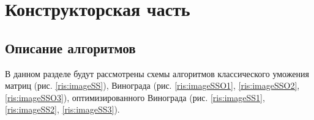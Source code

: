 \chapter{Конструкторская часть}

\section{Описание алгоритмов}
В данном разделе будут рассмотрены схемы алгоритмов классического уможения матриц (рис. \ref{ris:imageSS}), Винограда (рис. \ref{ris:imageSSO1}, \ref{ris:imageSSO2}, \ref{ris:imageSSO3}), оптимизированного Винограда (рис. \ref{ris:imageSS1}, \ref{ris:imageSS2}, \ref{ris:imageSS3}).
\begin{center}
	

\newpage
	\centering
	\def\svgwidth{7cm}
	
	\label{ris:imageSS}
\newpage
\centering
\def\svgwidth{3.5cm}

\label{ris:imageSSO1}
\newpage
\centering
\def\svgwidth{7cm}

\label{ris:imageSSO2}
\newpage
\centering
\def\svgwidth{12cm}

\label{ris:imageSSO3}
\newpage
	\centering
	\def\svgwidth{3.5cm}
	
	\label{ris:imageSS1}
\newpage
	\centering
	\def\svgwidth{8cm}
	
	\label{ris:imageSS2}
\newpage
	\centering
		\def\svgwidth{12cm}
	
	\label{ris:imageSS3}

\end{center}
\newpage

